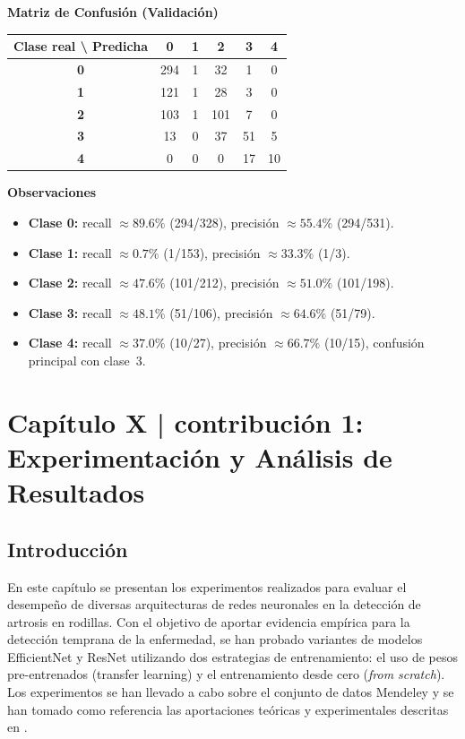 \documentclass[11pt,spanish,listoffigures,listoftables]{tfgetsinf}
\begin{document}
\noindent\textbf{Matriz de Confusión (Validación)}
\begin{table}[h]
  \centering
  \begin{tabular}{c|ccccc}
    \toprule
    \textbf{Clase real \textbackslash{} Predicha} & 0   & 1   & 2    & 3   & 4   \\ 
    \midrule
    \textbf{0} & 294 & 1   & 32   & 1   & 0   \\
    \textbf{1} & 121 & 1   & 28   & 3   & 0   \\
    \textbf{2} & 103 & 1   & 101  & 7   & 0   \\
    \textbf{3} & 13  & 0   & 37   & 51  & 5   \\
    \textbf{4} & 0   & 0   & 0    & 17  & 10  \\
    \bottomrule
  \end{tabular}
\end{table}

\bigskip

\noindent\textbf{Observaciones}
\begin{itemize}
  \item \textbf{Clase 0:} recall $\approx 89.6\%$ (294/328), precisión $\approx 55.4\%$ (294/531).
  \item \textbf{Clase 1:} recall $\approx 0.7\%$ (1/153), precisión $\approx 33.3\%$ (1/3).
  \item \textbf{Clase 2:} recall $\approx 47.6\%$ (101/212), precisión $\approx 51.0\%$ (101/198).
  \item \textbf{Clase 3:} recall $\approx 48.1\%$ (51/106), precisión $\approx 64.6\%$ (51/79).
  \item \textbf{Clase 4:} recall $\approx 37.0\%$ (10/27), precisión $\approx 66.7\%$ (10/15), confusión principal con clase~3.
\end{itemize}


\chapter{Capítulo X | contribución 1: Experimentación y Análisis de Resultados}

\section{Introducción}
En este capítulo se presentan los experimentos realizados para evaluar el desempeño de diversas arquitecturas de redes neuronales en la detección de artrosis en rodillas. Con el objetivo de aportar evidencia empírica para la detección temprana de la enfermedad, se han probado variantes de modelos EfficientNet y ResNet utilizando dos estrategias de entrenamiento: el uso de pesos pre-entrenados (transfer learning) y el entrenamiento desde cero (\textit{from scratch}). Los experimentos se han llevado a cabo sobre el conjunto de datos Mendeley \cite{chen2018knee} y se han tomado como referencia las aportaciones teóricas y experimentales descritas en \cite{efficientnet_paper}. 
\end{document}
